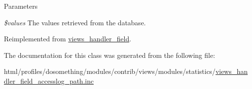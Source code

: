 \begin{DoxyParams}{Parameters}
\item[{\em \$values}]The values retrieved from the database. \end{DoxyParams}


Reimplemented from \hyperlink{classviews__handler__field_a82ff951c5e9ceb97b2eab86f880cbc1e}{views\_\-handler\_\-field}.

The documentation for this class was generated from the following file:\begin{DoxyCompactItemize}
\item 
html/profiles/dosomething/modules/contrib/views/modules/statistics/\hyperlink{views__handler__field__accesslog__path_8inc}{views\_\-handler\_\-field\_\-accesslog\_\-path.inc}\end{DoxyCompactItemize}
